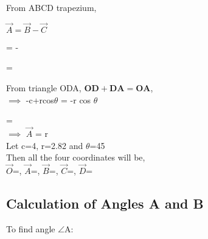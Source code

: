\documentclass[journal,10pt,twocolumn]{article}
\begin{document}
\begin{flushleft}
\vspace{0.35cm}
\begin{flushleft}
From ABCD trapezium, \\
\end{flushleft}
\begin{center}
$\vec{A} =\vec{B}-  \vec{C}$\\
\end{center}

\center
\vspace{0.4cm}
=  - 
   
\endcenter{}
		= 
	\\
\vspace{0.3cm}
\begin{flushleft}
From triangle ODA,
$\boldsymbol{OD+DA=OA}$, \\
\vspace{0.2cm} 
$\implies$ -c+rcos$\theta$ = -r cos $\theta$\\
\end{flushleft}
\vspace{0.35cm}
	=  \\
\endcenter{}
	$\implies$ $\vec{A}$
	= r \\

Let c=4, r=2.82 and $\theta$=45 \textdegree \\

Then all the four coordinates will be, \\

\vspace{0.3cm}
$\vec{O}$=, $\vec{A}$=, $\vec{B}$=, $\vec{C}$=, $\vec{D}$=
\\

\subsection{Calculation of Angles A and B}
\vspace{0.25cm}
To find angle $\angle$A:\\


\end{flushleft}
\end{document}
